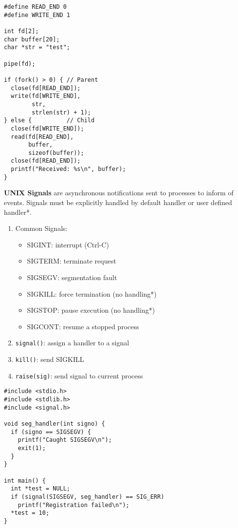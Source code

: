 \documentclass[12pt, a4paper]{article}
\begin{document}
\begin{multicols*}{3}
\begin{lstlisting}
#define READ_END 0 
#define WRITE_END 1 

int fd[2];
char buffer[20];
char *str = "test";

pipe(fd);

if (fork() > 0) { // Parent
  close(fd[READ_END]);
  write(fd[WRITE_END],
        str,
        strlen(str) + 1);
} else {          // Child
  close(fd[WRITE_END]);
  read(fd[READ_END],
       buffer,
       sizeof(buffer));
  close(fd[READ_END]);
  printf("Received: %s\n", buffer);
}
\end{lstlisting}

\colbreak
\textbf{UNIX Signals} are asynchronous notifications sent to processes to inform of events. Signals must be explicitly handled by default handler or user defined handler*. 
\begin{enumerate}[\roman*.]
  \item Common Signals:
      \begin{itemize}[leftmargin=*]
        \item SIGINT: interrupt (Ctrl-C)
        \item SIGTERM: terminate request
        \item SIGSEGV: segmentation fault
        \item SIGKILL: force termination (no handling*)
        \item SIGSTOP: pause execution (no handling*)
        \item SIGCONT: resume a stopped process
      \end{itemize}
  \item \lstinline|signal()|: assign a handler to a signal
  \item \lstinline|kill()|: send SIGKILL
  \item \lstinline|raise(sig)|: send signal to current process
\end{enumerate}

\begin{lstlisting}
#include <stdio.h>
#include <stdlib.h>
#include <signal.h> 

void seg_handler(int signo) {
  if (signo == SIGSEGV) {
    printf("Caught SIGSEGV\n");
    exit(1);
  }
}

int main() {
  int *test = NULL;
  if (signal(SIGSEGV, seg_handler) == SIG_ERR)
    printf("Registration failed\n");
  *test = 10;
}
\end{lstlisting}

\colbreak

\end{multicols*}
\end{document}
